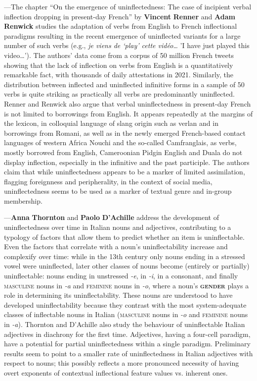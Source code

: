 \documentclass[output=paper]{langscibook}
\begin{document}
—The chapter “On the emergence of uninflectedness: The case of incipient verbal inflection dropping in present-day French” by \textbf{Vincent} \textbf{Renner} and \textbf{Adam} \textbf{Renwick} studies the adaptation of verbs from English to French inflectional paradigms resulting in the recent emergence of uninflected variants for a large number of such verbs (e.g., \textit{je viens de ‘play’ cette vidéo…} 'I have just played this video…’). The authors’ data come from a corpus of 50 million French tweets showing that the lack of inflection on verbs from English is a quantitatively remarkable fact, with thousands of daily attestations in 2021. Similarly, the distribution between inflected and uninflected infinitive forms in a sample of 50 verbs is quite striking as practically all verbs are predominantly uninflected. Renner and Renwick also argue that verbal uninflectedness in present-day French is not limited to borrowings from English. It appears repeatedly at the margins of the lexicon, in colloquial language of slang origin such as verlan and in borrowings from Romani, as well as in the newly emerged French-based contact languages of western Africa Nouchi and the so-called Camfranglais, as verbs, mostly borrowed from English, Cameroonian Pidgin English and Duala do not display inflection, especially in the infinitive and the past participle. The authors claim that while uninflectedness appears to be a marker of limited assimilation, flagging foreignness and peripherality, in the context of social media, uninflectedness seems to be used as a marker of textual genre and in-group membership. 

—\textbf{Anna} \textbf{Thornton} and \textbf{Paolo} \textbf{D’Achille} address the development of uninflectedness over time in Italian nouns and adjectives, contributing to a typology of factors that allow them to predict whether an item is uninflectable. Even the factors that correlate with a noun’s uninflectability increase and complexify over time: while in the 13th century only nouns ending in a stressed vowel were uninflected, later other classes of nouns become (entirely or partially) uninflectable: nouns ending in unstressed \textit{{}-e}, in \textit{{}-i}, in a consonant, and finally \textsc{masculine} nouns in \textit{{}-a} and \textsc{feminine} nouns in \textit{{}-o}, where a noun’s \textbf{\textsc{gender}} plays a role in determining its uninflectability. These nouns are understood to have developed uninflectability because they contrast with the most system-adequate classes of inflectable nouns in Italian (\textsc{masculine} nouns in \textit{{}-o} and \textsc{feminine} nouns in \textit{{}-a}). Thornton and D’Achille also study the behaviour of uninflectable Italian adjectives in diachrony for the first time. Adjectives, having a four-cell paradigm, have a potential for partial uninflectedness within a single paradigm. Preliminary results seem to point to a smaller rate of uninflectedness in Italian adjectives with respect to nouns; this possibly reflects a more pronounced necessity of having overt exponents of contextual inflectional feature values vs. inherent ones.
\end{document}
